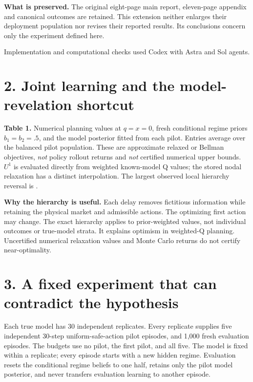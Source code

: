 \documentclass[10pt,a4paper]{article}
\begin{document}
\textbf{What is preserved.} The original eight-page main report, eleven-page
appendix and canonical outcomes are retained.
This extension neither enlarges their deployment population nor revises their
reported results. Its conclusions concern only the experiment defined here.

{\small Implementation and computational checks used Codex with Astra and Sol agents.\par}

\newpage
\section*{2. Joint learning and the model-revelation shortcut}


\begin{center}\small

\end{center}
{\small\textbf{Table 1.} Numerical planning values at $q=x=0$, fresh conditional
regime priors $b_1=b_2=.5$, and the model posterior fitted from each pilot.
Entries average over the balanced pilot population. These are approximate
relaxed or Bellman objectives, \emph{not} policy rollout returns and \emph{not}
certified numerical upper bounds. $U^1$ is evaluated directly from weighted
known-model Q values; the stored nodal relaxation has a distinct interpolation.
The largest observed local hierarchy reversal is \MaxHierarchyViolation{}.}

\textbf{Why the hierarchy is useful.} Each delay removes fictitious information
while retaining the physical market and admissible actions. The optimizing first
action may change. The exact hierarchy applies to prior-weighted values, not
individual outcomes or true-model strata. It explains optimism in weighted-Q
planning. Uncertified numerical relaxation values and Monte Carlo returns do not
certify near-optimality.



\newpage
\section*{3. A fixed experiment that can contradict the hypothesis}
Each true model has 30 independent replicates. Every replicate supplies five
independent 30-step uniform-safe-action pilot episodes, and 1,000 fresh evaluation
episodes. The budgets use no pilot, the first pilot, and all five. The model is
fixed within a replicate; every episode starts with a new hidden regime.
Evaluation resets the conditional regime beliefs to one half, retains only the
pilot model posterior, and never transfers evaluation learning to another episode.
\end{document}
